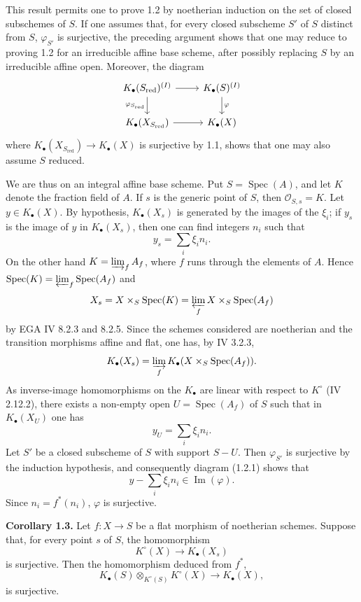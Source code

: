 \documentclass[11pt]{article}
\newcommand{\Spec}{\operatorname{Spec}}
\begin{document}
This result permits one to prove 1.2 by noetherian induction on the set of closed subschemes of $S$. If one assumes that, for every closed subscheme $S'$ of $S$ distinct from $S$, $\varphi_{S'}$ is surjective, the preceding argument shows that one may reduce to proving 1.2 for an irreducible affine base scheme, after possibly replacing $S$ by an irreducible affine open. Moreover, the diagram
\[
\begin{tikzcd}
K_\bullet(S_{\mathrm{red}})^{(I)} \arrow[r] \arrow[d,"\varphi_{S_{\mathrm{red}}}"'] & K_\bullet(S)^{(I)} \arrow[d,"\varphi"]\\
K_\bullet(X_{S_{\mathrm{red}}}) \arrow[r] & K_\bullet(X)
\end{tikzcd}
\]
where $K_\bullet(X_{S_{\mathrm{red}}})\to K_\bullet(X)$ is surjective by 1.1, shows that one may also assume $S$ reduced.

We are thus on an integral affine base scheme. Put $S=\Spec(A)$, and let $K$ denote the fraction field of $A$. If $s$ is the generic point of $S$, then $\mathcal O_{S,s}=K$. Let $y\in K_\bullet(X)$. By hypothesis, $K_\bullet(X_s)$ is generated by the images of the $\xi_i$; if $y_s$ is the image of $y$ in $K_\bullet(X_s)$, then one can find integers $n_i$ such that
\[
 y_s=\sum_i \xi_i n_i.
\]
On the other hand $K=\varinjlim_f A_f$, where $f$ runs through the elements of $A$. Hence $\Spec(K)=\varprojlim_f \Spec(A_f)$ and
\[
 X_s=X\times_S\Spec(K)=\varprojlim_f X\times_S\Spec(A_f)
\]
by EGA IV 8.2.3 and 8.2.5. Since the schemes considered are noetherian and the transition morphisms affine and flat, one has, by IV 3.2.3,
\[
 K_\bullet(X_s)=\varinjlim_f K_\bullet(X\times_S\Spec(A_f)).
\]
As inverse-image homomorphisms on the $K_\bullet$ are linear with respect to $K^\circ$ (IV 2.12.2), there exists a non-empty open $U=\Spec(A_f)$ of $S$ such that in $K_\bullet(X_U)$ one has
\[
 y_U=\sum_i \xi_i n_i.
\]
Let $S'$ be a closed subscheme of $S$ with support $S-U$. Then $\varphi_{S'}$ is surjective by the induction hypothesis, and consequently diagram (1.2.1) shows that
\[
 y-
\sum_i\xi_i n_i\in \operatorname{Im}(\varphi).
\]
Since $n_i=f^*(n_i)$, $\varphi$ is surjective.

\textbf{Corollary 1.3.} Let $f:X\to S$ be a flat morphism of noetherian schemes. Suppose that, for every point $s$ of $S$, the homomorphism
\[
 K^\circ(X)\longrightarrow K_\bullet(X_s)
\]
is surjective. Then the homomorphism deduced from $f^*$,
\[
 K_\bullet(S)\otimes_{K^\circ(S)}K^\circ(X)\longrightarrow K_\bullet(X),
\]
is surjective.
\end{document}
